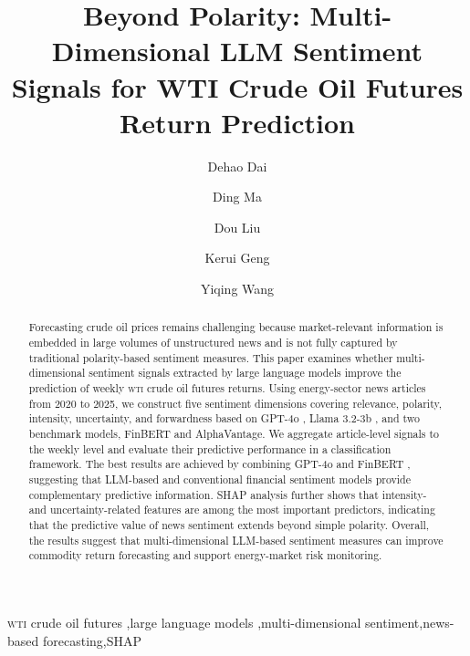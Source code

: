 \documentclass[preprint,12pt,authoryear]{elsarticle}
\newcommand{\wti}{\textsc{wti}}
\newcommand{\gpt}{GPT-4o }
\newcommand{\llama}{Llama 3.2-3b }
\newcommand{\finbert}{FinBERT }
\begin{document}
\begin{frontmatter}

\title{Beyond Polarity: Multi-Dimensional LLM Sentiment Signals for WTI Crude Oil Futures Return Prediction}

\author[author1]{Dehao Dai}
\author[author2]{Ding Ma}
\author[author3]{Dou Liu}
\author[author4]{Kerui Geng}
\author[author5]{Yiqing Wang}




\begin{abstract}
Forecasting crude oil prices remains challenging because market-relevant information is embedded in large volumes of unstructured news and is not fully captured by traditional polarity-based sentiment measures. This paper examines whether multi-dimensional sentiment signals extracted by large language models improve the prediction of weekly \wti{} crude oil futures returns. Using energy-sector news articles from 2020 to 2025, we construct five sentiment dimensions covering relevance, polarity, intensity, uncertainty, and forwardness based on \gpt, \llama, and two benchmark models, \finbert and AlphaVantage. We aggregate article-level signals to the weekly level and evaluate their predictive performance in a classification framework. The best results are achieved by combining \gpt and \finbert, suggesting that LLM-based and conventional financial sentiment models provide complementary predictive information. SHAP analysis further shows that intensity- and uncertainty-related features are among the most important predictors, indicating that the predictive value of news sentiment extends beyond simple polarity. Overall, the results suggest that multi-dimensional LLM-based sentiment measures can improve commodity return forecasting and support energy-market risk monitoring.
\end{abstract}

\begin{keyword}
\wti{} crude oil futures \sep large language models \sep multi-dimensional sentiment\sep  news-based forecasting\sep SHAP
\end{keyword}

\end{frontmatter}
\end{document}
